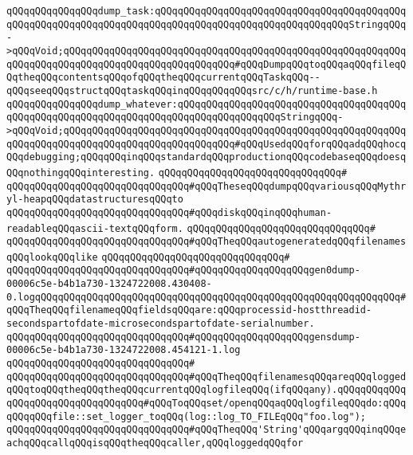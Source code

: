 \verb|qQQqqQQqqQQqqQQqdump_task:qQQqqQQqqQQqqQQqqQQqqQQqqQQqqQQqqQQqqQQqqQQqqQQqqQQqqQQqqQQqqQQqqQQqqQQqqQQqqQQqqQQqqQQqqQQqqQQqqQQqqQQqStringqQQq->qQQqVoid;qQQqqQQqqQQqqQQqqQQqqQQqqQQqqQQqqQQqqQQqqQQqqQQqqQQqqQQqqQQqqQQqqQQqqQQqqQQqqQQqqQQqqQQqqQQqqQQqqQQq#qQQqDumpqQQqtoqQQqaqQQqfileqQQqtheqQQqcontentsqQQqofqQQqtheqQQqcurrentqQQqTaskqQQq--qQQqseeqQQqstructqQQqtaskqQQqinqQQqqQQqqQQqsrc/c/h/runtime-base.h|\newline
\verb|qQQqqQQqqQQqqQQqdump_whatever:qQQqqQQqqQQqqQQqqQQqqQQqqQQqqQQqqQQqqQQqqQQqqQQqqQQqqQQqqQQqqQQqqQQqqQQqqQQqqQQqqQQqqQQqStringqQQq->qQQqVoid;qQQqqQQqqQQqqQQqqQQqqQQqqQQqqQQqqQQqqQQqqQQqqQQqqQQqqQQqqQQqqQQqqQQqqQQqqQQqqQQqqQQqqQQqqQQqqQQqqQQq#qQQqUsedqQQqforqQQqadqQQqhocqQQqdebugging;qQQqqQQqinqQQqstandardqQQqproductionqQQqcodebaseqQQqdoesqQQqnothingqQQqinteresting.|\newline
\verb|qQQqqQQqqQQqqQQqqQQqqQQqqQQqqQQq#|\newline
\verb|qQQqqQQqqQQqqQQqqQQqqQQqqQQqqQQq#qQQqTheseqQQqdumpqQQqvariousqQQqMythryl-heapqQQqdatastructuresqQQqto|\newline
\verb|qQQqqQQqqQQqqQQqqQQqqQQqqQQqqQQq#qQQqdiskqQQqinqQQqhuman-readableqQQqascii-textqQQqform.|\newline
\verb|qQQqqQQqqQQqqQQqqQQqqQQqqQQqqQQq#|\newline
\verb|qQQqqQQqqQQqqQQqqQQqqQQqqQQqqQQq#qQQqTheqQQqautogeneratedqQQqfilenamesqQQqlookqQQqlike|\newline
\verb|qQQqqQQqqQQqqQQqqQQqqQQqqQQqqQQq#|\newline
\verb|qQQqqQQqqQQqqQQqqQQqqQQqqQQqqQQq#qQQqqQQqqQQqqQQqqQQqgen0dump-00006c5e-b4b1a730-1324722008.430408-0.logqQQqqQQqqQQqqQQqqQQqqQQqqQQqqQQqqQQqqQQqqQQqqQQqqQQqqQQqqQQqqQQq#qQQqTheqQQqfilenameqQQqfieldsqQQqare:qQQqprocessid-hostthreadid-secondspartofdate-microsecondspartofdate-serialnumber.|\newline
\verb|qQQqqQQqqQQqqQQqqQQqqQQqqQQqqQQq#qQQqqQQqqQQqqQQqqQQqgensdump-00006c5e-b4b1a730-1324722008.454121-1.log|\newline
\verb|qQQqqQQqqQQqqQQqqQQqqQQqqQQqqQQq#|\newline
\verb|qQQqqQQqqQQqqQQqqQQqqQQqqQQqqQQq#qQQqTheqQQqfilenamesqQQqareqQQqloggedqQQqtoqQQqtheqQQqtheqQQqcurrentqQQqlogfileqQQq(ifqQQqany).qQQqqQQqqQQqqQQqqQQqqQQqqQQqqQQqqQQq#qQQqToqQQqset/openqQQqaqQQqlogfileqQQqdo:qQQqqQQqqQQqfile::set_logger_toqQQq(log::log_TO_FILEqQQq"foo.log");|\newline
\verb|qQQqqQQqqQQqqQQqqQQqqQQqqQQqqQQq#qQQqTheqQQq'String'qQQqargqQQqinqQQqeachqQQqcallqQQqisqQQqtheqQQqcaller,qQQqloggedqQQqfor|\newline
